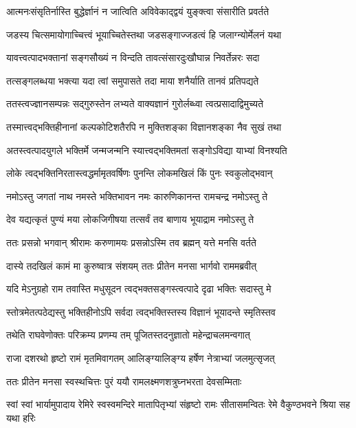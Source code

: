 \twolineshloka
{आत्मनःसंसृतिर्नास्ति बुद्धेर्ज्ञानं न जात्विति}
{अविवेकाद्द्वयं युङ्क्त्वा संसारीति प्रवर्तते} %

\twolineshloka
{जडस्य चित्समायोगाच्चित्त्वं भूयाच्चितेस्तथा}
{जडसङ्गाज्जडत्वं हि जलाग्न्योर्मेलनं यथा} %

\twolineshloka
{यावत्त्वत्पादभक्तानां सङ्गसौख्यं न विन्दति}
{तावत्संसारदुःखौघान्न निवर्तेन्नरः सदा} %

\twolineshloka
{तत्सङ्गलब्धया भक्त्या यदा त्वां समुपासते}
{तदा माया शनैर्याति तानवं प्रतिपद्यते} %

\twolineshloka
{ततस्त्वज्ज्ञानसम्पन्नः सद्गुरुस्तेन लभ्यते}
{वाक्यज्ञानं गुरोर्लब्ध्वा त्वत्प्रसादाद्विमुच्यते} %

\twolineshloka
{तस्मात्त्वद्भक्तिहीनानां कल्पकोटिशतैरपि}
{न मुक्तिशङ्का विज्ञानशङ्का नैव सुखं तथा} %

\twolineshloka
{अतस्त्वत्पादयुगले भक्तिर्मे जन्मजन्मनि}
{स्यात्त्वद्भक्तिमतां सङ्गोऽविद्या याभ्यां विनश्यति} %

\twolineshloka
{लोके त्वद्भक्तिनिरतास्त्वद्धर्मामृतवर्षिणः}
{पुनन्ति लोकमखिलं किं पुनः स्वकुलोद्भवान्} %

\twolineshloka
{नमोऽस्तु जगतां नाथ नमस्ते भक्तिभावन}
{नमः कारुणिकानन्त रामचन्द्र नमोऽस्तु ते} %

\twolineshloka
{देव यद्यत्कृतं पुण्यं मया लोकजिगीषया}
{तत्सर्वं तव बाणाय भूयाद्राम नमोऽस्तु ते} %

\twolineshloka
{ततः प्रसन्नो भगवान् श्रीरामः करुणामयः}
{प्रसन्नोऽस्मि तव ब्रह्मन् यत्ते मनसि वर्तते} %

\twolineshloka
{दास्ये तदखिलं कामं मा कुरुष्वात्र संशयम्}
{ततः प्रीतेन मनसा भार्गवो राममब्रवीत्} %

\twolineshloka
{यदि मेऽनुग्रहो राम तवास्ति मधुसूदन}
{त्वद्भक्तसङ्गस्त्वत्पादे दृढा भक्तिः सदास्तु मे} %

\twolineshloka
{स्तोत्रमेतत्पठेद्यस्तु भक्तिहीनोऽपि सर्वदा}
{त्वद्भक्तिस्तस्य विज्ञानं भूयादन्ते स्मृतिस्तव} %

\twolineshloka
{तथेति राघवेणोक्तः परिक्रम्य प्रणम्य तम्}
{पूजितस्तदनुज्ञातो महेन्द्राचलमन्वगात्} %

\twolineshloka
{राजा दशरथो हृष्टो रामं मृतमिवागतम्}
{आलिङ्ग्यालिङ्ग्य हर्षेण नेत्राभ्यां जलमुत्सृजत्} %

\twolineshloka
{ततः प्रीतेन मनसा स्वस्थचित्तः पुरं ययौ}
{रामलक्ष्मणशत्रुघ्नभरता देवसम्मिताः} %

\threelineshloka
{स्वां स्वां भार्यामुपादाय रेमिरे स्वस्वमन्दिरे}
{मातापितृभ्यां संहृष्टो रामः सीतासमन्वितः}
{रेमे वैकुण्ठभवने श्रिया सह यथा हरिः} %

